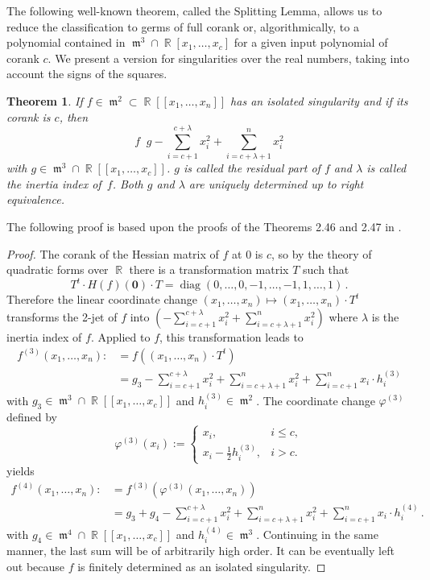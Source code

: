 \documentclass[noend]{amsproc}
\newtheorem{theorem}{Theorem}
\DeclareMathOperator{\requiv}{\overset{r}{\sim}}
\DeclareMathOperator{\m}{\mathfrak{m}}
\DeclareMathOperator{\diag}{diag}
\DeclareMathOperator{\R}{\mathbb{R}}
\begin{document}
The following well-known theorem, called the Splitting Lemma, allows us to
reduce the classification to germs of full corank or, algorithmically, to
a polynomial contained in $\m^3 \cap \R[x_1,\ldots,x_c]$ for a given input
polynomial of corank $c$. We present a version for singularities over the real
numbers, taking into account the signs of the squares.

\begin{theorem}\label{SplittingLemma}
If $f \in \m^2 \subset \R[[x_1,\ldots,x_n]]$ has an isolated singularity and if
its corank is $c$, then
\[
f \requiv g -\sum_{i=c+1}^{c+\lambda} x_i^2 +\sum_{i=c+\lambda+1}^n x_i^2
\]
with $g \in \m^3 \cap \R[[x_1,\ldots,x_c]]$. $g$ is called the residual part of
$f$ and $\lambda$ is called the inertia index of~$f$. Both $g$ and $\lambda$
are uniquely determined up to right equivalence.
\end{theorem}

The following proof is based upon the proofs of the Theorems 2.46 and 2.47 in
\cite{GLS2007}.

\begin{proof}
The corank of the Hessian matrix of $f$ at $0$ is $c$, so by the theory of
quadratic forms over $\R$ there is a transformation matrix $T$ such that
\[
T^t \cdot H(f)(\mathbf{0}) \cdot T = \diag(0,\ldots,0,-1,\ldots,-1,1,\ldots,1)
\,.
\]
Therefore the linear coordinate change
$(x_1,\ldots,x_n) \mapsto (x_1,\ldots,x_n) \cdot T^t$ transforms the 2-jet of
$f$ into
$\left(-\sum_{i=c+1}^{c+\lambda} x_i^2 +\sum_{i=c+\lambda+1}^n x_i^2\right)$
where $\lambda$ is the inertia index of $f$.
Applied to $f$, this transformation leads to
\begin{align*}
f^{(3)} (x_1,\ldots,x_n)
  :\!&= f((x_1,\ldots,x_n) \cdot T^t) \\
  &= g_3
  -\sum_{i=c+1}^{c+\lambda} x_i^2 +\sum_{i=c+\lambda+1}^n x_i^2
  +\sum_{i=c+1}^n x_i\cdot h_i^{(3)}
\end{align*}
with $g_3 \in \m^3 \cap \R[[x_1,\ldots,x_c]]$ and $h_i^{(3)} \in \m^2$. The
coordinate change $\varphi^{(3)}$ defined by
\[
\varphi^{(3)}(x_i) :=
\begin{cases}
x_i, &i \leq c, \\
x_i-\frac{1}{2}h_i^{(3)}, &i > c.
\end{cases}
\]
yields
\begin{align*}
f^{(4)} (x_1,\ldots,x_n)
  :\!&= f^{(3)}(\varphi^{(3)}(x_1,\ldots,x_n)) \\
  &= g_3 +g_4
  -\sum_{i=c+1}^{c+\lambda} x_i^2 +\sum_{i=c+\lambda+1}^n x_i^2
  +\sum_{i=c+1}^n x_i\cdot h_i^{(4)} \,.
\end{align*}
with $g_4 \in \m^4 \cap \R[[x_1,\ldots,x_c]]$ and $h_i^{(4)} \in \m^3$.
Continuing in the same manner, the last sum will be of arbitrarily high order.
It can be eventually left out because $f$ is finitely determined as an isolated
singularity.
\end{proof}
\end{document}
